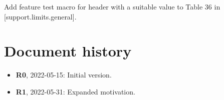 Add feature test macro
 for header  with a suitable value to
Table 36 in [support.limits.general].


\section*{Document history}

\begin{itemize}
\item \textbf{R0}, 2022-05-15: Initial version.
\item \textbf{R1}, 2022-05-31: Expanded motivation.
\end{itemize}





\renewcommand{\bibname}{References}



